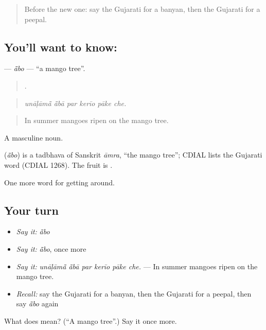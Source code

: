 \begin{quote}
Before the new one: say the Gujarati for a banyan, then the Gujarati for a peepal.
\end{quote}

\subsection*{You'll want to know: }
\textbf{} — \emph{ā̃bo} — \textquotedblleft{}a mango tree\textquotedblright{}.

\begin{quote}
     .
\end{quote}

\begin{quote}
\emph{unāḷāmā̃ ā̃bā par kerīo pāke che.}
\end{quote}

\begin{quote}
In summer mangoes ripen on the mango tree.
\end{quote}

A masculine noun.

\begin{cousinweb}
\textbf{} (\emph{ā̃bo}) is a tadbhava of Sanskrit \emph{āmra}, \textquotedblleft{}the mango tree\textquotedblright{}; CDIAL lists the Gujarati word (CDIAL 1268). The fruit is .
\end{cousinweb}

\begin{grammarlens}[title={What you've built}]
One more word for getting around.
\end{grammarlens}

\subsection*{Your turn}
\begin{itemize}
\raggedright
  \item \emph{Say it:} \emph{ā̃bo}
  \item \emph{Say it:} \emph{ā̃bo}, once more
  \item \emph{Say it:} \emph{unāḷāmā̃ ā̃bā par kerīo pāke che.} — In summer mangoes ripen on the mango tree.
  \item \emph{Recall:} say the Gujarati for a banyan, then the Gujarati for a peepal, then say \emph{ā̃bo} again
\end{itemize}

\begin{tcolorbox}[breakable,colback=teal!4,colframe=teal!35!black,title={Before you move on}]
What does  mean? (\textquotedblleft{}A mango tree\textquotedblright{}.) Say it once more.
\end{tcolorbox}
